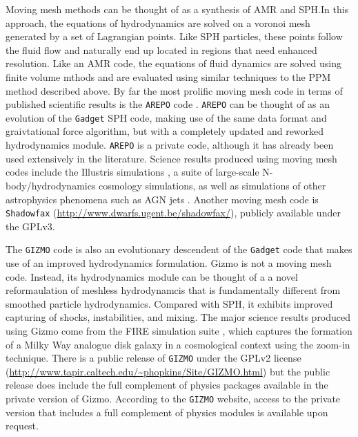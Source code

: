 \documentclass[11pt,twoside]{article}
\begin{document}
Moving mesh methods can be thought of as a synthesis of AMR and SPH.\@  In this approach, the equations of hydrodynamics are solved on a voronoi mesh generated by a set of Lagrangian points. Like SPH particles, these points follow the fluid flow and naturally end up located in regions that need enhanced resolution. Like an AMR code, the equations of fluid dynamics are solved using finite volume mthods and are evaluated using similar techniques to the PPM method described above. By far the most prolific moving mesh code in terms of published scientific results is the \texttt{AREPO} code \citep{springel2010}. \texttt{AREPO} can be thought of as an evolution of the \texttt{Gadget} SPH code, making use of the same data format and graivtational force algorithm, but with a completely updated and reworked hydrodynamics module. \texttt{AREPO} is a private code, although it has already been used extensively in the literature. Science results produced using moving mesh codes include the Illustris simulations \citep{vogelsberger2014}, a suite of large-scale N-body/hydrodynamics cosmology simulations, as well as simulations of other astrophysics phenomena such as AGN jets \citep{weinberger2017}. Another moving mesh code is \texttt{Shadowfax} \citep{vandenbroucke2016} (\url{http://www.dwarfs.ugent.be/shadowfax/}), publicly available under the GPLv3.

The \texttt{GIZMO} code \citep{hopkins2015} is also an evolutionary descendent of the \texttt{Gadget} code that makes use of an improved hydrodynamics formulation. Gizmo is not a moving mesh code. Instead, its hydrodynamics module can be thought of a a novel reformaulation of meshless hydrodynamcis that is fundamentally different from smoothed particle hydrodynamics. Compared with SPH, it exhibits improved capturing of shocks, instabilities, and mixing. The major science results produced using Gizmo come from the FIRE simulation suite \citep{hopkins2017}, which captures the formation of a Milky Way analogue disk galaxy in a cosmological context using the zoom-in technique. There is a public release of \texttt{GIZMO} under the GPLv2 license ({\small \url{http://www.tapir.caltech.edu/~phopkins/Site/GIZMO.html}}) but the public release does include the full complement of physics packages available in the private version of Gizmo. According to the \texttt{GIZMO} website, access to the private version that includes a full complement of physics modules is available upon request.

\end{document}
